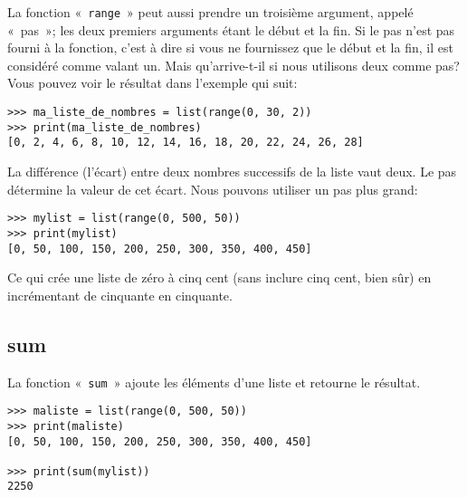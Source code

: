 La fonction « \texttt{range} » peut aussi prendre un troisième argument, appelé « pas »; les deux premiers arguments étant le début et la fin.
Si le pas n'est pas fourni à la fonction, c'est à dire si vous ne fournissez que le début et la fin, il est considéré comme valant un. Mais qu'arrive-t-il si nous utilisons deux comme pas? Vous pouvez voir le résultat dans l'exemple qui suit:
\begin{Verbatim}[frame=single,rulecolor=\color{gray}]
>>> ma_liste_de_nombres = list(range(0, 30, 2))
>>> print(ma_liste_de_nombres)
[0, 2, 4, 6, 8, 10, 12, 14, 16, 18, 20, 22, 24, 26, 28]
\end{Verbatim}

La différence (l'écart) entre deux nombres successifs de la liste vaut deux. Le pas détermine la valeur de cet écart. Nous pouvons utiliser un pas plus grand:
\begin{Verbatim}[frame=single,rulecolor=\color{gray}]
>>> mylist = list(range(0, 500, 50))
>>> print(mylist)
[0, 50, 100, 150, 200, 250, 300, 350, 400, 450]
\end{Verbatim}

Ce qui crée une liste de zéro à cinq cent (sans inclure cinq cent, bien sûr) en incrémentant de cinquante en cinquante.

\subsection*{sum}

La fonction « \texttt{sum} » ajoute les éléments d'une liste et retourne le résultat.
\begin{Verbatim}[frame=single,rulecolor=\color{gray}]
>>> maliste = list(range(0, 500, 50))
>>> print(maliste)
[0, 50, 100, 150, 200, 250, 300, 350, 400, 450]

>>> print(sum(mylist))
2250
\end{Verbatim}


